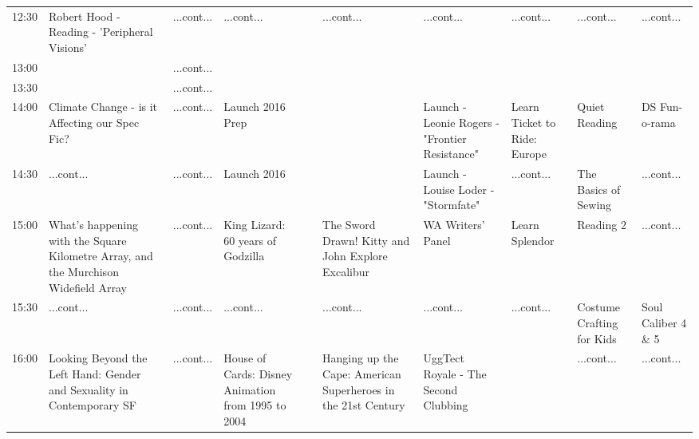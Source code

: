 \documentclass{scrreprt}
\begin{document}
\begin{landscape}
\begin{tabular}{c||p{25mm}|p{25mm}|p{25mm}|p{25mm}|p{25mm}|p{25mm}|p{25mm}|p{25mm}|p{25mm}|}
12:30&\cellcolor[gray]{0.534715} Robert Hood - Reading -  'Peripheral Visions'&\cellcolor[gray]{0.619790} ...cont...&\cellcolor[gray]{0.825010} ...cont...&&\cellcolor[gray]{0.688326} ...cont...&\cellcolor[gray]{0.789003} ...cont...&\cellcolor[gray]{0.654284} ...cont...&\cellcolor[gray]{0.703331} ...cont...&\cellcolor[gray]{0.679616} ...cont...\\
13:00&&\cellcolor[gray]{0.619790} ...cont...&&&&&&&\\
13:30&&\cellcolor[gray]{0.619790} ...cont...&&&&&&&\\
14:00&\cellcolor[gray]{0.584093} Climate Change - is it Affecting our Spec Fic?&\cellcolor[gray]{0.619790} ...cont...&\cellcolor[gray]{0.782027} Launch 2016 Prep&&&\cellcolor[gray]{0.698998} Launch - Leonie Rogers - "Frontier Resistance"&\cellcolor[gray]{0.810007} Learn Ticket to Ride: Europe&\cellcolor[gray]{0.986963} Quiet Reading&\cellcolor[gray]{0.501019} DS Fun-o-rama\\
14:30&\cellcolor[gray]{0.584093} ...cont...&\cellcolor[gray]{0.619790} ...cont...&\cellcolor[gray]{0.584107} Launch 2016&&&\cellcolor[gray]{0.964803} Launch - Louise Loder - "Stormfate"&\cellcolor[gray]{0.810007} ...cont...&\cellcolor[gray]{0.897318} The Basics of Sewing&\cellcolor[gray]{0.501019} ...cont...\\
15:00&\cellcolor[gray]{0.921818} What's happening with the Square Kilometre Array, and the Murchison Widefield Array&\cellcolor[gray]{0.619790} ...cont...&\cellcolor[gray]{0.602584} King Lizard: 60 years of Godzilla&&\cellcolor[gray]{0.520303} The Sword Drawn! Kitty and John Explore Excalibur&\cellcolor[gray]{0.849876} WA Writers' Panel&\cellcolor[gray]{0.753612} Learn Splendor&\cellcolor[gray]{0.572569} Reading 2&\cellcolor[gray]{0.501019} ...cont...\\
15:30&\cellcolor[gray]{0.921818} ...cont...&\cellcolor[gray]{0.619790} ...cont...&\cellcolor[gray]{0.602584} ...cont...&&\cellcolor[gray]{0.520303} ...cont...&\cellcolor[gray]{0.849876} ...cont...&\cellcolor[gray]{0.753612} ...cont...&\cellcolor[gray]{0.664804} Costume Crafting for Kids&\cellcolor[gray]{0.817675} Soul Caliber 4 \& 5\\
16:00&\cellcolor[gray]{0.704118} Looking Beyond the Left Hand: Gender and Sexuality in Contemporary SF&\cellcolor[gray]{0.619790} ...cont...&\cellcolor[gray]{0.991209} House of Cards: Disney Animation from 1995 to 2004&&\cellcolor[gray]{0.770194} Hanging up the Cape: American Superheroes in the 21st Century&\cellcolor[gray]{0.670247} UggTect Royale - The Second Clubbing&&\cellcolor[gray]{0.664804} ...cont...&\cellcolor[gray]{0.817675} ...cont...\\

\end{tabular}
\end{landscape}
\end{document}
